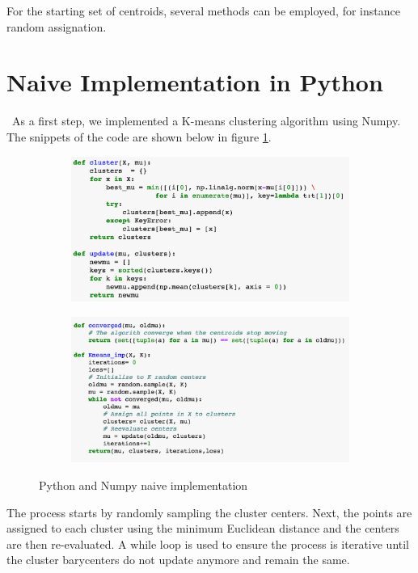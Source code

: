\documentclass[11pt]{article}
\begin{document}
\noindent For the starting set of centroids, several methods can be employed, for instance random assignation.


\section*{Naive Implementation in Python}\
As a first step, we implemented a K-means clustering algorithm using Numpy. The snippets of the code are shown below in figure \ref{naive}.
	
		\begin{figure}[h!]
			\centering 
			\begin{subfigure}{0.7\textwidth}
				\includegraphics[width=\textwidth]{Figures/Imp1.png}
			\end{subfigure}
			\quad
			\begin{subfigure}{0.7\textwidth}
				\includegraphics[width=\textwidth]{Figures/Imp2.png}
			\end{subfigure} 
			\caption{Python and Numpy naive implementation}
			\label{naive}
		\end{figure}
\noindent The process starts by randomly sampling the cluster centers. Next, the points are assigned to each cluster using the minimum Euclidean distance and the centers are then re-evaluated. A while loop is used to ensure the process is iterative until the cluster barycenters do not update anymore and remain the same.\\
\end{document}
